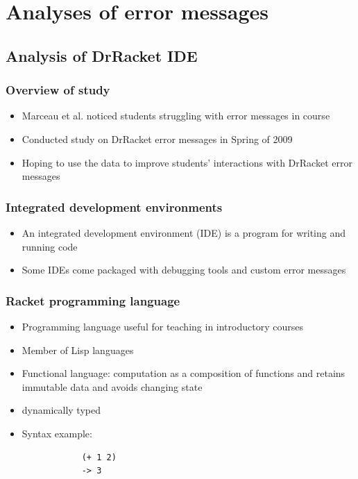 \documentclass{beamer}
\begin{document}
\section[Analyses]{Analyses of error messages}

\subsection[DrRacket Analysis]{Analysis of DrRacket IDE}


\begin{frame}
  \frametitle{Overview of study}
  \begin{itemize}
  	\item Marceau et al. noticed students struggling with error messages in course
  	\item Conducted study on DrRacket error messages in Spring of 2009
  	\item Hoping to use the data to improve students' interactions with DrRacket error messages
  \end{itemize}
\end{frame}

\begin{frame}
	\frametitle{Integrated development environments}
		\begin{itemize}
			\item An integrated development environment (IDE) is a program for writing and running code
			\item Some IDEs come packaged with debugging tools and custom error messages
		\end{itemize}
\end{frame}

\begin{frame}[fragile]
	\frametitle{Racket programming language}
		\begin{itemize}
			\item Programming language useful for teaching in introductory courses
			\item Member of Lisp languages
			\item Functional language: computation as a composition of functions and retains immutable data and avoids changing state
			\item dynamically typed
			\item Syntax example:
			\begin{verbatim}
			(+ 1 2)
			-> 3
			\end{verbatim}
		\end{itemize}

\end{frame}
\end{document}
